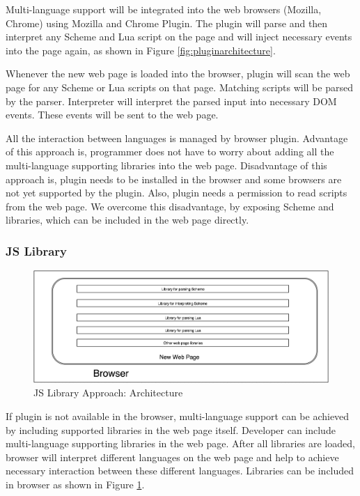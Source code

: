 Multi-language support will be integrated into the web browsers (Mozilla, Chrome) using Mozilla and Chrome Plugin. The plugin will parse and then interpret any Scheme and Lua script on the page and will inject necessary events into the page again, as shown in Figure \ref{fig:pluginarchitecture}.

Whenever the new web page is loaded into the browser, plugin will scan the web page for any Scheme or Lua scripts on that page. Matching scripts will be parsed by the parser. Interpreter will interpret the parsed input into necessary DOM events. These events will be sent to the web page. 

All the interaction between languages is managed by browser plugin. Advantage of this approach is, programmer does not have to worry about adding all the multi-language supporting libraries into the web page. Disadvantage of this approach is, plugin needs to be installed in the browser and some browsers are not yet supported by the plugin. Also, plugin needs a permission to read scripts from the web page. We overcome this disadvantage, by exposing Scheme and libraries, which can be included in the web page directly.

\subsubsection{JS Library}

\begin{figure}[h]
	\begin{center}
		\includegraphics[width=\linewidth]{./images/JSLibraryApproach.png}
	\end{center}
	\caption{JS Library Approach: Architecture}
	\label{fig:jslibraryarchitecture}
\end{figure}

If plugin is not available in the browser, multi-language support can be achieved by including supported libraries in the web page itself. Developer can include multi-language supporting libraries in the web page. After all libraries are loaded, browser will interpret different languages on the web page and help to achieve necessary interaction between these different languages. Libraries can be included in browser as shown in Figure \ref{fig:jslibraryarchitecture}.
